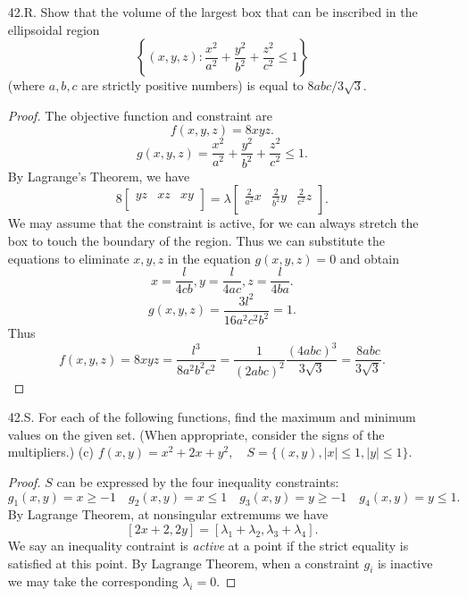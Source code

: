 \begin{itemize}
\begin{proof}
	However, we could let $x = -1, y = -N, z = 10+N$ where $N > 0$. Then $x+y+z = 9$ and $xyz = N(10+N) > N^2$. By picking large enough $N$ we see that the product of $x,y,z$ can be arbitrarily large. This is not detected by Lagrange multipliers, because this extremum is at infinity, not at a critical point.
\end{proof}

\item [42.R.] Show that the volume of the largest box that can be inscribed in the ellipsoidal region
\[
\left\{(x, y, z): \frac{x^2}{a^2}+\frac{y^2}{b^2}+\frac{z^2}{c^2} \leq 1\right\}
\]
(where $a, b, c$ are strictly positive numbers) is equal to $8 a b c / 3 \sqrt{3}$.
\begin{proof}
	The objective function and constraint are
	\[
		f(x,y,z) = 8 xyz
	.\] 
	\[
		g(x,y,z) = \frac{x^2}{a^2}+\frac{y^2}{b^2}+\frac{z^2}{c^2} \le  1
	.\] 
	By Lagrange's Theorem, we have
	\[
		8
		\begin{bmatrix}
			yz  & xz  & xy \\
		\end{bmatrix}
		=
		\lambda
		\begin{bmatrix}
			\frac{2}{a^2} x  & \frac{2}{b^2 }y  & \frac{2}{c^2 }z \\
		\end{bmatrix}
	.\] 
	We may assume that the constraint is active, for we can always stretch the box to touch the boundary of the region. Thus we can substitute the equations to eliminate $x,y,z$ in the equation $g(x,y,z) = 0$ and obtain
	\[
		x = \frac{l}{4 c b},
		y = \frac{l}{4 a c},
		z = \frac{l}{4 b a}
	.\] 
	\[
		g(x,y,z) = \frac{3 l^{2}}{16 a^{2} c^{2} b^{2}} = 1
	.\] 
	Thus
	\[
		f(x,y,z) = 8 xyz = \frac{l^{3}}{8 a^{2} b^{2} c^{2}} = \frac{1}{(2abc)^2} \frac{(4abc)^3}{3 \sqrt{3} } = \frac{8abc}{3\sqrt{3} }
	.\] 
\end{proof}

\item [42.S.] For each of the following functions, find the maximum and minimum values on the given set. (When appropriate, consider the signs of the multipliers.)
(c) $f(x, y)=x^2+2 x+y^2, \quad S=\{(x, y),|x| \leq 1,|y| \leq 1\}$.
\begin{proof}
	$S$ can be expressed by the four inequality constraints:
	\[
		g_1(x,y) = x\ge -1\quad g_2(x,y) = x\le 1\quad
		g_3(x,y) = y \ge -1 \quad g_4(x,y) = y \le 1
	.\] 
	By Lagrange Theorem, at nonsingular extremums we have
	\[
		[2x+2, 2y] = [\lambda_1 + \lambda_2, \lambda_3 + \lambda_4]
	.\] 
	We say an inequality contraint is \textit{active} at a point if the strict equality is satisfied at this point. By Lagrange Theorem, when a constraint $g_i$ is inactive we may take the corresponding $\lambda_i=0$.


\end{proof}
\end{itemize}
